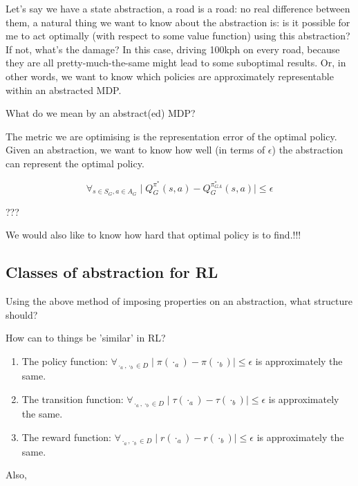 Let's say we have a state abstraction, a road is a road: no real difference
between them, a natural thing we want to know about the abstraction is:
is it possible for me to act optimally (with respect to some value function)
using this abstraction? If not, what's the damage? In this case, driving 100kph on every road,
because they are all pretty-much-the-same might lead to some suboptimal results.
Or, in other words, we want to know which policies are approximately representable within an abstracted MDP.

What do we mean by an abstract(ed) MDP?

The metric we are optimising is the representation error of the optimal
policy. Given an abstraction, we want to know how well (in terms of $\epsilon$) the abstraction
can represent the optimal policy.

\[
\forall_{s\in S_G, a\in A_G} \mid Q_G^{\pi^* }(s, a) - Q_G^{\pi_{GA}^* }(s, a) \mid \le \epsilon
\]
\cite{Abel2017}

???

We would also like to know how hard that optimal policy is to find.!!!


\subsection{Classes of abstraction for RL}

Using the above method of imposing properties on an abstraction, what structure should?

How can to things be 'similar' in RL?

\begin{enumerate}
\tightlist
\item
  The policy function:
  \(\forall_{\cdot_a, \cdot_b \in D} \mid \pi(\cdot_a) - \pi(\cdot_b) \mid \le \epsilon\)
  is approximately the same.
\item
  The transition function:
  \(\forall_{\cdot_a, \cdot_b \in D} \mid \tau(\cdot_a) - \tau(\cdot_b)\mid \le \epsilon\)
  is approximately the same.
\item
  The reward function:
  \(\forall_{\cdot_a, \cdot_b \in D} \mid r(\cdot_a) - r(\cdot_b) \mid \le \epsilon\)
  is approximately the same.
\end{enumerate}

Also,

